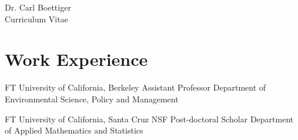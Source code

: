 \documentclass[10pt]{article} %
\begin{document}
\begin{paracol}{2} %


\parbox[top][0.12\textheight][c]{\linewidth}{ %
	\vspace{-0.04\textheight} %
	\centering %
	{\sffamily\Huge Dr. Carl Boettiger}\\\medskip %
	{\Huge\color{headings}\cvtextfont Curriculum Vitae}
}




\section{Work Experience}





{FT} %
{University of California, Berkeley} %
{Assistant Professor} %
{Department of Environmental Science, Policy and Management} %


{FT} %
{University of California, Santa Cruz} %
{NSF Post-doctoral Scholar} %
{Department of Applied Mathematics and Statistics}  %



\end{paracol}
\end{document}
